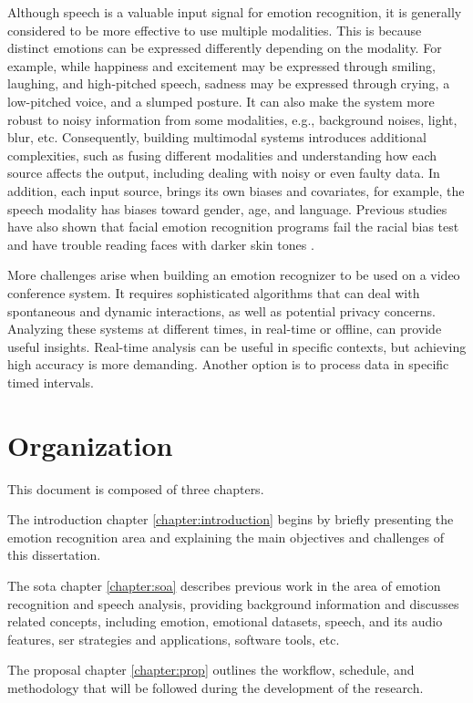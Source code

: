 Although speech is a valuable input signal for emotion recognition, it is generally considered to be more effective to use multiple modalities. This is because distinct emotions can be expressed differently depending on the modality. For example, while happiness and excitement may be expressed through smiling, laughing, and high-pitched speech, sadness may be expressed through crying, a low-pitched voice, and a slumped posture. It can also make the system more robust to noisy information from some modalities, e.g., background noises, light, blur, etc. Consequently, building multimodal systems introduces additional complexities, such as fusing different modalities and understanding how each source affects the output, including dealing with noisy or even faulty data. In addition, each input source, brings its own biases and covariates, for example, the speech modality has biases toward gender, age, and language. Previous studies have also shown that facial emotion recognition programs fail the racial bias test and have trouble reading faces with darker skin tones \cite{hagerty2021}.

More challenges arise when building an emotion recognizer to be used on a video conference system. It requires sophisticated algorithms that can deal with spontaneous and dynamic interactions, as well as potential privacy concerns. Analyzing these systems at different times, in real-time or offline, can provide useful insights. Real-time analysis can be useful in specific contexts, but achieving high accuracy is more demanding. Another option is to process data in specific timed intervals.

\section{Organization}

This document is composed of three chapters.

The introduction chapter \ref{chapter:introduction} begins by briefly presenting the emotion recognition area and explaining the main objectives and challenges of this dissertation.

The \ac{sota} chapter \ref{chapter:soa} describes previous work in the area of emotion recognition and speech analysis, providing background information and discusses related concepts, including emotion, emotional datasets, speech, and its audio features, \ac{ser} strategies and applications, software tools, etc.

The proposal chapter \ref{chapter:prop} outlines the workflow, schedule, and methodology that will be followed during the development of the research.

